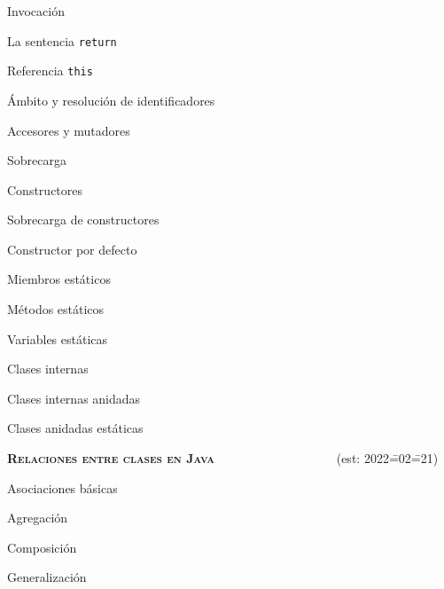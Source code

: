 \begin{longenum}
\begin{longenum}
\begin{longenum}
\begin{longenum}
                \item Invocación
                \item La sentencia \texttt{return}
                \item Referencia \texttt{this}
                \item Ámbito y resolución de identificadores
                \item Accesores y mutadores
                \item Sobrecarga
                \item Constructores
                \begin{longenum}
                    \item Sobrecarga de constructores
                    \item Constructor por defecto
                \end{longenum}
            \end{longenum}
        \end{longenum}
        \item Miembros estáticos
        \begin{longenum}
            \item Métodos estáticos
            \item Variables estáticas
        \end{longenum}
        \item Clases internas
        \begin{longenum}
            \item Clases internas anidadas
            \item Clases anidadas estáticas
        \end{longenum}
    \end{longenum}
    \item \textbf{\textsc{Relaciones entre clases en Java}} \ \ \ \ \ \ \ \ \ \ \ \ \ \ \ \ \ \ \ (est: 2022\==02\==21)
    \begin{longenum}
        \item Asociaciones básicas
        \begin{longenum}
            \item Agregación
            \item Composición
        \end{longenum}
        \item Generalización
        \begin{longenum}

\end{longenum}
\end{longenum}
\end{longenum}

